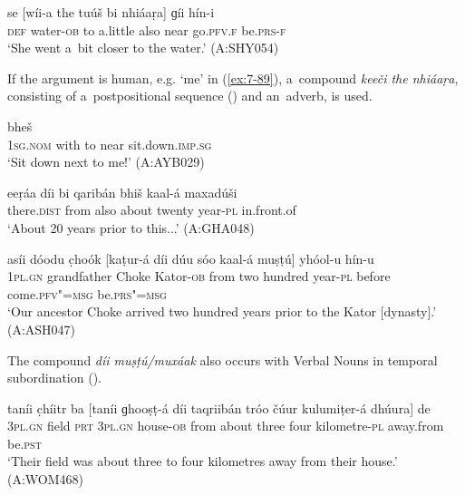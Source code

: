 \begin{exe}
\ex
\label{ex:7-88}
\gll se [wíi-a the tuúš bi nhiáaṛa] ɡíi hín-i \\
\textsc{def} water-\textsc{ob} to a.little also near go.\textsc{pfv.f} be.\textsc{prs-f} \\
\glt `She went a~bit closer to the water.' (A:SHY054)
\end{exe}

If the argument is human, e.g. `me' in (\ref{ex:7-89}), a~compound \textit{keeči the nhiáaṛa}, consisting of a~postpositional sequence () and an~adverb, is used.

\begin{exe}
\ex
\label{ex:7-89}
 bheš \\
\textsc{1sg.nom} with to near sit.down.\textsc{imp.sg} \\
\glt `Sit down next to me!' (A:AYB029)
\end{exe}


\begin{exe}
\ex
\label{ex:7-90}
\gll eeṛáa díi bi qaribán bhiš kaal-á maxadúši \\
there.\textsc{dist} from also about twenty year-\textsc{pl} in.front.of \\
\glt `About 20 years prior to this...' (A:GHA048)
\end{exe}
\begin{exe}
\ex
\label{ex:7-91}
\gll asíi dóodu c̣hoók [kaṭur-á díi dúu sóo kaal-á muṣṭú] yhóol-u
hín-u \\
\textsc{1pl.gn} grandfather Choke Kator-\textsc{ob} from two hundred year-\textsc{pl} before come.\textsc{pfv"=msg} be.\textsc{prs"=msg}  \\
\glt `Our ancestor Choke arrived two hundred years prior to the Kator [dynasty].' (A:ASH047)
\end{exe}

The compound \textit{díi muṣṭú/muxáak} also occurs with Verbal Nouns in temporal subordination (). 



\begin{exe}
\ex
\label{ex:7-92}
\gll taníi c̣híitr ba [taníi ɡhooṣṭ-á díi taqriibán tróo čúur
  kulumiṭer-á dhúura] de \\
\textsc{3pl.gn} field \textsc{prt} \textsc{3pl.gn} house-\textsc{ob} from about three four kilometre-\textsc{pl} away.from be.\textsc{pst}  \\
\glt `Their field was about three to four kilometres away from their house.' (A:WOM468)
\end{exe}


